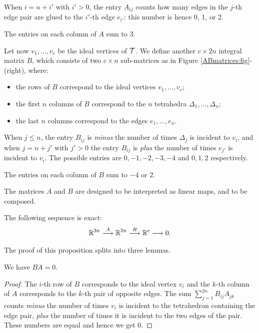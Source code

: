 When $i=n+i'$ with $i'>0$, the entry $A_{ij}$ counts how many edges in the $j$-th edge pair are glued to the $i'$-th edge $e_{i'}$: this number is hence 0, 1, or 2.

\begin{ex}
The entries on each column of $A$ sum to $3$.
\end{ex}

Let now $v_1,\ldots, v_c$ be the ideal vertices of $\mathcal{T}$. We define another $c \times 2n$ integral matrix $B$, which consists of two $c\times n$ sub-matrices as in Figure \ref{ABmatrices:fig}-(right), where:
\begin{itemize}
\item the rows of $B$ correspond to the ideal vertices $v_1,\ldots, v_c$;
\item the first $n$ columns of $B$ correspond to the $n$ tetrahedra $\Delta_1,\ldots, \Delta_n$;
\item the last $n$ columns correspond to the edges $e_1,\ldots, e_n$.
\end{itemize}

When $j \leqslant n$, the entry $B_{ij}$ is \emph{minus} the number of times $\Delta_j$ is incident to $v_i$, and when $j = n+j'$ with $j'>0$ the entry $B_{ij}$ is \emph{plus} the number of times $e_{j'}$ is incident to $v_i$. The possible entries are $0,-1,-2,-3,-4$ and $0,1,2$ respectively.

\begin{ex}
The entries on each column of $B$ sum to $-4$ or $2$.
\end{ex}

The matrices $A$ and $B$ are designed to be interpreted as linear maps, and to be composed.

\begin{prop} \label{AB:exact:prop}
The following sequence is exact:
$$ \mathbb{R}^{3n} \stackrel{A}{\longrightarrow} \mathbb{R}^{2n} \stackrel{B}{\longrightarrow} \mathbb{R}^c \longrightarrow 0.$$
\end{prop}
The proof of this proposition splits into three lemmas. 

\begin{lemma} We have $BA = 0$.
\end{lemma}
\begin{proof}
The $i$-th row of $B$ corresponds to the ideal vertex $v_i$ and the $k$-th column of $A$ corresponds to the $k$-th pair of opposite edges. The sum $\sum_{j=1}^{2n} B_{ij} A_{jk}$ counts \emph{minus} the number of times $v_i$ is incident to the tetrahedron containing the edge pair, \emph{plus} the number of times it is incident to the two edges of the pair. These numbers are equal and hence we get 0.
\end{proof}

